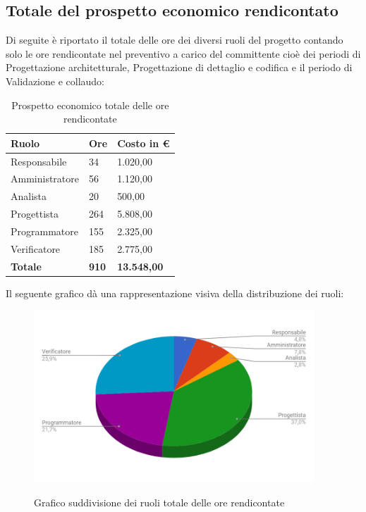 \documentclass[PianoDiProgetto.tex]{subfiles}
\begin{document}
\subsection{Totale del prospetto economico rendicontato}
Di seguite è riportato il totale delle ore dei diversi ruoli del progetto contando solo le ore rendicontate nel preventivo a carico del committente cioè dei periodi di Progettazione architetturale, Progettazione di dettaglio e codifica e il periodo di Validazione e collaudo:
\begin{center}
	\begin{table}[htbp]
		\centering
		\renewcommand\arraystretch{1.5}
		\begin{tabularx}{\textwidth}{p{5cm}|p{4cm}|p{4cm}}
			\hline
			\textbf{Ruolo} & \textbf{Ore} & \textbf{Costo in \euro} \\
			\hline
			Responsabile & 34 & 1.020,00 \\
			\hline
			Amministratore & 56 & 1.120,00 \\
			\hline
			Analista & 20 & 500,00 \\
			\hline
			Progettista & 264 & 5.808,00 \\
			\hline
			Programmatore & 155 & 2.325,00 \\
			\hline
			Verificatore & 185 & 2.775,00 \\
			\hline
			\textbf{Totale} & \textbf{910} & \textbf{13.548,00}\\
			\hline
		\end{tabularx}
	\caption{Prospetto economico totale delle ore rendicontate}
	\label{my-label}
	\end{table} 
\end{center}
Il seguente grafico dà una rappresentazione visiva della distribuzione dei ruoli:
\begin{figure}[h]
	\centering
	\includegraphics[width=10.5cm]{images/prospettoEconomico/totRen.png}
	\label{fig:foo}
	\caption{Grafico suddivisione dei ruoli totale delle ore rendicontate}
\end{figure} 
\clearpage
\end{document}
